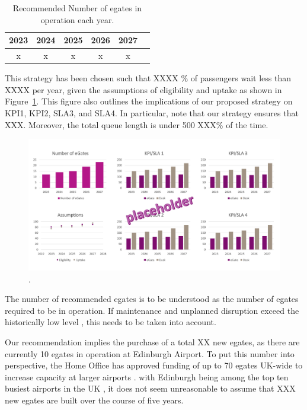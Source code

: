 \documentclass[10pt]{article}
\begin{document}
\begin{table}[!htp]
    \centering
    \begin{tabular}{cccccc}
         2023 & 2024 & 2025 & 2026 & 2027  \\ \hline
          x & x & x & x & x
    \end{tabular}
    \caption{Recommended Number of \glspl{egate} in operation each year.}
    \label{tab:recommendation}
\end{table}

This strategy has been chosen such that XXXX \% of passengers wait less than XXXX per year, given the assumptions of eligibility and uptake as shown in Figure~\ref{fig:recommendation}. This figure also outlines the implications of our proposed strategy on KPI1, KPI2, SLA3, and SLA4. In particular, note that our strategy ensures that XXX. Moreover, the total queue length is under 500 XXX\% of the time.

\begin{figure}[!ht]
    \centering
    \includegraphics[width=\textwidth]{figures/placeholder_recommendations.png}
     \caption{.} \label{fig:recommendation}
\end{figure}

The number of recommended \glspl{egate} is to be understood as the number of \glspl{egate} required to be in operation. If maintenance and unplanned disruption exceed the historically low level \cite{Inspection_eGates}, this needs to be taken into account. 

Our recommendation implies the purchase of a total XX new \glspl{egate}, as there are currently 10 \glspl{egate} in operation at Edinburgh Airport. To put this number into perspective, the Home Office has approved funding of up to 70 \glspl{egate} UK-wide to increase capacity at larger airports \cite{Inspection_eGates}. with Edinburgh being among the top ten busiest airports in the UK \cite{busiestairport}, it does not seem unreasonable to assume that XXX new \glspl{egate} are built over the course of five years. 
\end{document}
